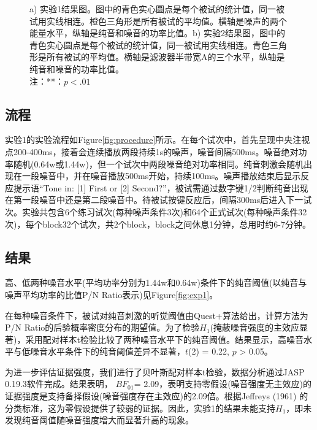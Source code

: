 \documentclass[jou,12pt,floatsintext]{apa7} %
\begin{document}
\begin{figure}[bp]
\begin{minipage}{0.608\textwidth}
        \label{fig:exp2plot}
    \end{minipage}
    \captionsetup{labelsep=period}
    \caption{\small \rm a) 实验1结果图。图中的青色实心圆点是每个被试的统计值，同一被试用实线相连。橙色三角形是所有被试的平均值。横轴是噪声的两个能量水平，纵轴是纯音和噪音的功率比值。b) 实验2结果图，图中的青色实心圆点是每个被试的统计值，同一被试用实线相连。青色三角形是所有被试的平均值。横轴是滤波器半带宽A的三个水平，纵轴是纯音和噪音的功率比值。\\
    注：**：\(p<.01\)}
\end{figure}

\subsection{\heiti 流程}
\vspace{-1em}
实验1的实验流程如Figure\ref{fig:procedure}所示。在每个试次中，首先呈现中央注视点200-400ms，接着会连续播放两段持续1s的噪声，噪音间隔500ms。噪音绝对功率随机(0.64w或1.44w)，但一个试次中两段噪音绝对功率相同。纯音刺激会随机出现在一段噪音中，并在噪音播放500ms开始，持续100ms。噪声播放结束后显示反应提示语``Tone in: [1] First or [2] Second?''，被试需通过数字键1/2判断纯音出现在第一段噪音中还是第二段噪音中。待被试按键反应后，间隔300ms后进入下一试次。实验共包含6个练习试次(每种噪声条件3次)和64个正式试次(每种噪声条件32次)，每个block32个试次，共2个block，block之间休息1分钟，总用时约6-7分钟。


\subsection{\heiti 结果}
\vspace{-1em}

高、低两种噪音水平(平均功率分别为1.44w和0.64w)条件下的纯音阈值(以纯音与噪声平均功率的比值P/N Ratio表示)见Figure\ref{fig:exp1}。

在每种噪音条件下，被试对纯音刺激的听觉阈值由Quest+算法给出，计算方法为P/N Ratio的后验概率密度分布的期望值。为了检验\(H_1\)(掩蔽噪音强度的主效应显著)，采用配对样本t检验比较了两种噪音水平下的纯音阈值。结果显示，高噪音水平与低噪音水平条件下的纯音阈值差异不显著，\(t\)(2) = 0.22, \(p\) > 0.05。

为进一步评估证据强度，我们进行了贝叶斯配对样本t检验，数据分析通过JASP 0.19.3软件完成。结果表明， \(BF_{01}\)= 2.09，表明支持零假设(噪音强度无主效应)的证据强度是支持备择假设(噪音强度存在主效应)的2.09倍。根据Jeffreys (1961) 的分类标准，这为零假设提供了较弱的证据。因此，实验1的结果未能支持\(H_1\)，即未发现纯音阈值随噪音强度增大而显著升高的现象。
\end{document}
